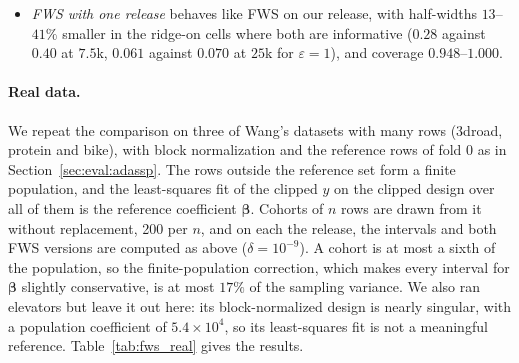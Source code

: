 \documentclass[11pt]{article}
\theoremstyle{definition}
\theoremstyle{plain}
\newcommand{\bbeta}{\boldsymbol{\beta}}
\begin{document}
\begin{itemize}
  \item \emph{FWS with one release} behaves like FWS on our release, with half-widths $13$--$41\%$ smaller in the ridge-on cells where both are informative ($0.28$ against $0.40$ at $7.5$k, $0.061$ against $0.070$ at $25$k for $\varepsilon = 1$), and coverage $0.948$--$1.000$.
\end{itemize}

\paragraph{Real data.} We repeat the comparison on three of Wang's datasets with many rows (3droad, protein and bike), with block normalization and the reference rows of fold 0 as in Section~\ref{sec:eval:adassp}. The rows outside the reference set form a finite population, and the least-squares fit of the clipped $y$ on the clipped design over all of them is the reference coefficient $\bbeta$. Cohorts of $n$ rows are drawn from it without replacement, 200 per $n$, and on each the release, the intervals and both FWS versions are computed as above ($\delta = 10^{-9}$). A cohort is at most a sixth of the population, so the finite-population correction, which makes every interval for $\bbeta$ slightly conservative, is at most $17\%$ of the sampling variance. We also ran elevators but leave it out here: its block-normalized design is nearly singular, with a population coefficient of $5.4 \times 10^4$, so its least-squares fit is not a meaningful reference. Table~\ref{tab:fws_real} gives the results.
\end{document}
